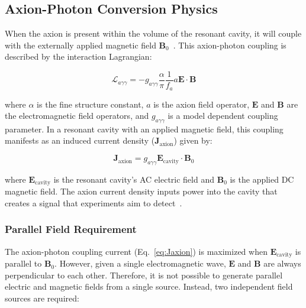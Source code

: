     \subsection{Axion-Photon Conversion Physics}

    When the axion is present within the volume of the resonant cavity, it will couple with the externally applied magnetic field $\textbf{B}_0$~\cite{Sikivie:2020zpn}. This axion-photon coupling is described by the interaction Lagrangian:

    \begin{equation}
         \mathcal{L}_{a\gamma \gamma} = -g_{a\gamma\gamma} \frac{\alpha}{\pi} \frac{1}{f_a} a \textbf{E} \cdot \textbf{B}
         \label{eq:Lagammgamma}
    \end{equation}
    
    \noindent where $\alpha$ is the fine structure constant, $a$ is the axion field operator, $\textbf{E}$ and $\textbf{B}$ are the electromagnetic field operators, and $g_{a\gamma\gamma}$ is a model dependent coupling parameter. In a resonant cavity with an applied magnetic field, this coupling manifests as an induced current density ($\mathbf{J}_{\text{axion}}$) given by:
    
    \begin{equation}
          \mathbf{J}_{\text{axion}} = g_{a\gamma\gamma} \mathbf{E}_{\text{cavity}} \cdot \mathbf{B}_{\text{0}} 
          \label{eq:Jaxion}
    \end{equation}
    
    \noindent where $\mathbf{E}_{\text{cavity}}$ is the resonant cavity's AC electric field and $\mathbf{B}_{\text{0}}$ is the applied DC magnetic field. The axion current density inputs power into the cavity that creates a signal that experiments aim to detect~\cite{Sikivie:2020zpn}.

    \subsubsection{Parallel Field Requirement}


    The axion-photon coupling current (Eq.~\ref{eq:Jaxion}) is maximized when $\mathbf{E}_{\text{cavity}} $ is parallel to $ \mathbf{B}_{\text{0}}$. However, given a single electromagnetic wave, $\mathbf{E}$ and $\mathbf{B}$ are always perpendicular to each other. Therefore, it is not possible to generate parallel electric and magnetic fields from a single source. Instead, two independent field sources are required:

